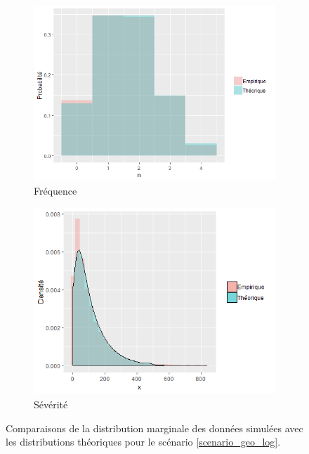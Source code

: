 \documentclass{article}
\begin{document}
	\begin{figure}[H]
		\begin{subfigure}[l]{0.5\textwidth}
			\includegraphics[width=\textwidth]{Graph/geo_log_N.png}
			\caption{Fréquence}
		\end{subfigure}
		\begin{subfigure}[r]{0.5\textwidth}
			\includegraphics[width=\textwidth]{Graph/geo_log_X.png}
			\caption{Sévérité}
		\end{subfigure}
		\caption{Comparaisons de la distribution marginale des données simulées avec les distributions théoriques pour le scénario \ref{scenario_geo_log}.}
		\label{graph_densite_geo_log}
	\end{figure}
	
\end{document}
